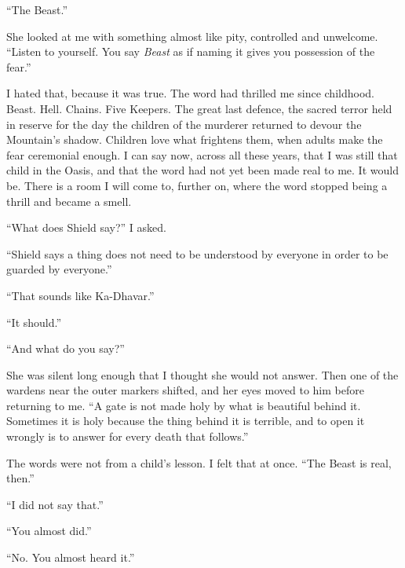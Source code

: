 ``The Beast.''\par

She looked at me with something almost like pity, controlled and unwelcome. ``Listen to yourself. You say \textit{Beast} as if naming it gives you possession of the fear.''\par

I hated that, because it was true. The word had thrilled me since childhood. Beast. Hell. Chains. Five Keepers. The great last defence, the sacred terror held in reserve for the day the children of the murderer returned to devour the Mountain's shadow. Children love what frightens them, when adults make the fear ceremonial enough. I can say now, across all these years, that I was still that child in the Oasis, and that the word had not yet been made real to me. It would be. There is a room I will come to, further on, where the word stopped being a thrill and became a smell.\par

``What does Shield say?'' I asked.\par

``Shield says a thing does not need to be understood by everyone in order to be guarded by everyone.''\par

``That sounds like Ka-Dhavar.''\par

``It should.''\par

``And what do you say?''\par

She was silent long enough that I thought she would not answer. Then one of the wardens near the outer markers shifted, and her eyes moved to him before returning to me. ``A gate is not made holy by what is beautiful behind it. Sometimes it is holy because the thing behind it is terrible, and to open it wrongly is to answer for every death that follows.''\par

The words were not from a child's lesson. I felt that at once. ``The Beast is real, then.''\par

``I did not say that.''\par

``You almost did.''\par

``No. You almost heard it.''\par

